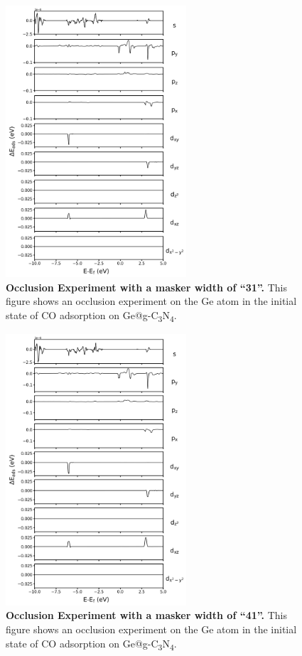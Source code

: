 \documentclass[a4paper, 12pt]{article}
\begin{document}
\begin{figure}[htbp]
  \centering
  \includegraphics[width=0.6\textwidth]{supp_fig27_occl_wid31.png}
  \caption{\textbf{Occlusion Experiment with a masker width of ``31''.}
  This figure shows an occlusion experiment on the Ge atom in
  the initial state of CO adsorption on Ge@g-C\textsubscript{3}N\textsubscript{4}.}
  \label{supp_fig27:occl_wid31}
\end{figure}

\begin{figure}[htbp]
  \centering
  \includegraphics[width=0.6\textwidth]{supp_fig28_occl_wid41.png}
  \caption{\textbf{Occlusion Experiment with a masker width of ``41''.}
  This figure shows an occlusion experiment on the Ge atom in
  the initial state of CO adsorption on Ge@g-C\textsubscript{3}N\textsubscript{4}.}
  \label{supp_fig28:occl_wid41}
\end{figure}
\end{document}
